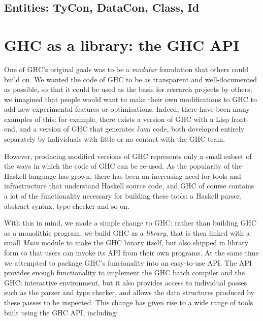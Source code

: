 \documentclass{article}
\begin{document}
\subsection{Entities: TyCon, DataCon, Class, Id}


\section{GHC as a library: the GHC API}
\label{s:ghcapi}

One of GHC's original goals was to be a \emph{modular} foundation that
others could build on.  We wanted the code of GHC to be as transparent
and well-documented as possible, so that it could be used as the basis
for research projects by others; we imagined that people would want to
make their own modifications to GHC to add new experimental features
or optimisations.  Indeed, there have been many examples of this: for
example, there exists a version of GHC with a Lisp front-end, and a
version of GHC that generates Java code, both developed entirely
separately by individuals with little or no contact with the GHC team.

However, producing modified versions of GHC represents only a small
subset of the ways in which the code of GHC can be re-used.  As the
popularity of the Haskell language has grown, there has been an
increasing need for tools and infrastructure that understand Haskell
source code, and GHC of course contains a lot of the functionality
necessary for building these tools: a Haskell parser, abstract syntax,
type checker and so on.

With this in mind, we made a simple change to GHC: rather than
building GHC as a monolithic program, we build GHC as a
\emph{library}, that is then linked with a small \emph{Main} module to
make the GHC binary itself, but also shipped in library form so that
users can invoke its API from their own programs.  At the same time we
attempted to package GHC's funcionality into an easy-to-use API.  The
API provides enough functionality to implement the GHC batch compiler
and the GHCi interactive environment, but it also provides access to
individual passes such as the parser and type checker, and allows the
data structures produced by these passes to be inspected.  This change
has given rise to a wide range of tools built using the GHC API,
including:
\end{document}
